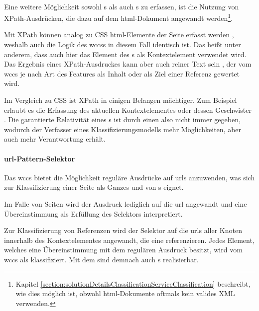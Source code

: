         \paragraph{\xpathSelector}
        Eine weitere Möglichkeit sowohl {\contentFeature}s als auch {}s
        zu erfassen, ist die Nutzung von XPath-Ausdrücken,
        die dazu auf dem \gls{html}-Dokument angewandt
        werden\footnote{Kapitel \ref{section:solutionDetailsClassificationServiceClassification}
        beschreibt, wie dies möglich ist, obwohl \gls{html}-Dokumente oftmals kein
        valides XML verwenden.}.

        Mit XPath können analog zu CSS \gls{html}-Elemente der Seite erfasst werden
        \cite{w3c:xpath},
        weshalb auch die Logik des \glspl{wccs} in diesem Fall identisch ist.
        Das heißt unter anderem, dass auch hier das Element des {\parentFeature}s
        als Kontextelement verwendet wird.
        Das Ergebnis eines XPath-Ausdruckes kann aber auch reiner Text sein
        \cite{w3c:xpath},
        der vom \gls{wccs} je nach Art des Features als Inhalt oder als Ziel einer
        Referenz gewertet wird.

        Im Vergleich zu CSS ist XPath in einigen Belangen mächtiger.
        Zum Beispiel erlaubt es die Erfassung des aktuellen Kontextelementes
        oder dessen Geschwister \cite{w3c:xpath}.
        Die garantierte Relativität eines {\cssSelector}s ist durch
        einen {\xpathSelector} also nicht immer gegeben,
        wodurch der Verfasser eines Klassifizierungsmodells mehr Möglichkeiten,
        aber auch mehr Verantwortung erhält.

        \paragraph{\gls{url}-Pattern-Selektor}
        Das \gls{wccs} bietet die Möglichkeit reguläre Ausdrücke auf \glspl{url} anzuwenden,
        was sich zur Klassifizierung einer Seite als Ganzes und von {}s eignet.

        Im Falle von Seiten wird der Ausdruck lediglich auf die \gls{url} angewandt
        und eine Übereinstimmung als Erfüllung des Selektors interpretiert.       
        
        Zur Klassifizierung von Referenzen wird der Selektor auf die \glspl{url} aller Knoten
        innerhalb des Kontextelementes angewandt, die eine {\resource} referenzieren.
        Jedes Element, welches eine Übereinstimmung mit dem regulären Ausdruck besitzt,
        wird vom \gls{wccs} als {} klassifiziert.
        Mit dem {\urlSelector} sind demnach auch {\collectionFeature}s realisierbar.

